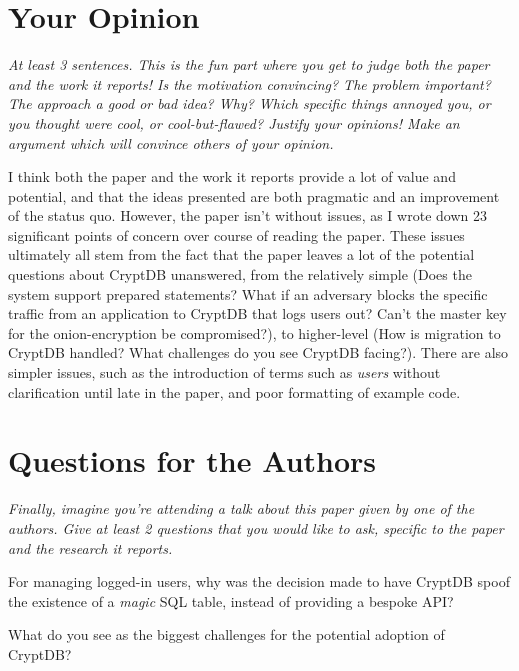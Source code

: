 \documentclass[11pt]{article}
\begin{document}
\section*{Your Opinion}

\textsl{At least 3 sentences. This is the fun part where you get to judge both
the paper and the work it reports! Is the motivation convincing? The problem
important? The approach a good or bad idea? Why? Which specific things annoyed
you, or you thought were cool, or cool-but-flawed? Justify your opinions! Make
an argument which will convince others of your opinion.}

I think both the paper and the work it reports provide a lot of value and
potential, and that the ideas presented are both pragmatic and an improvement
of the status quo. However, the paper isn't without issues, as I wrote down 23
significant points of concern over course of reading the paper. These issues
ultimately all stem from the fact that the paper leaves a lot of the potential
questions about CryptDB unanswered, from the relatively simple (Does the system
support prepared statements? What if an adversary blocks the specific traffic
from an application to CryptDB that logs users out? Can't the master key for
the onion-encryption be compromised?), to higher-level (How is migration to
CryptDB handled? What challenges do you see CryptDB facing?). There are also
simpler issues, such as the introduction of terms such as \textit{users}
without clarification until late in the paper, and poor formatting of example
code.

\section*{Questions for the Authors}

\textsl{Finally, imagine you're attending a talk about this paper given by one
of the authors. Give at least 2 questions that you would like to ask, specific
to the paper and the research it reports.}

For managing logged-in users, why was the decision made to have CryptDB spoof
the existence of a \textit{magic} SQL table, instead of providing a bespoke
API?

What do you see as the biggest challenges for the potential adoption of
CryptDB?




\end{document}
